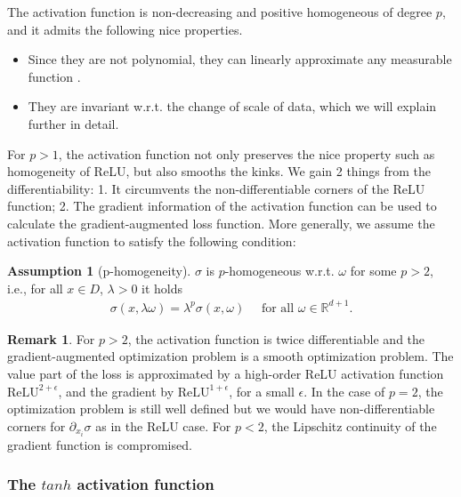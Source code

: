 \documentclass[12pt,fleqn]{amsart}
\theoremstyle{definition}
\newtheorem{assumption}{Assumption}[section]
\newtheorem{remark}{Remark}
\begin{document}
The activation function is non-decreasing and positive homogeneous of degree $p$, and it admits the following nice properties.
\begin{itemize}
	\item Since they are not polynomial, they can linearly approximate any measurable function \cite{leshno1993multilayer}.
	\item They are invariant w.r.t. the change of scale of data, which we will explain further in detail. 
\end{itemize}

For $p > 1$,  the activation function not only preserves the nice property such as homogeneity of ReLU, but also smooths the kinks. We gain 2 things from the differentiability: 1. It circumvents the non-differentiable corners of the ReLU function; 2. The gradient information of the activation function can be used to calculate the gradient-augmented loss function. More generally, we assume the activation function to satisfy the following condition:

\begin{assumption}[p-homogeneity]
	$\sigma$ is $p$-homogeneous w.r.t. $\omega$ for some $p > 2$, i.e., for all $x \in D$, $\lambda > 0$ it holds
\begin{align*}
	\sigma(x, \lambda \omega) = \lambda^p \sigma (x, \omega)\quad \text{ for all } \omega \in \mathbb{R}^{d + 1}.
\end{align*}
\end{assumption}
\begin{remark}
For $p > 2$, the activation function is twice differentiable and the gradient-augmented optimization problem is a smooth optimization problem.
The value part of the loss is approximated by a high-order ReLU activation function $\text{ReLU}^{2 + \epsilon}$, and the gradient by $\text{ReLU}^{1 + \epsilon}$,  for a small $\epsilon$. In the case of $p = 2$, the optimization problem is still well defined but we would have non-differentiable corners for $\partial_{x_i} \sigma$ as in the ReLU case. For $p < 2$, the Lipschitz continuity of the gradient function is compromised. 
\end{remark}



\subsubsection*{The $tanh$ activation function}
\end{document}
